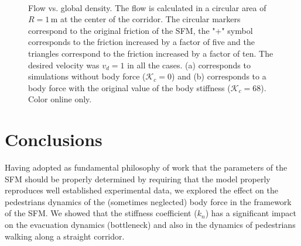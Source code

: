 \documentclass[preprint,12pt]{elsarticle}
\begin{document}
\begin{figure}[!htbp]
\centering
    \ 
    \\
\caption[width=0.47\columnwidth]{Flow vs. global density. The flow is calculated in a circular area of $R=1\,$m at the center of the corridor. The circular markers correspond to the original friction of the SFM, the "+" symbol corresponds to the friction increased by a factor of five and the triangles correspond to the friction increased by a factor of ten. The desired velocity was $v_d=1$ in all the cases. (a) corresponds to simulations without body force ($\mathcal{K}_c =$0) and (b) corresponds to a body force with the original value of the body stiffness ($\mathcal{K}_c =$68). Color online only.}
\label{flow_density}
\end{figure}



\section{\label{conclusions}Conclusions}


Having adopted as fundamental philosophy of work that the parameters of the SFM should be properly determined by requiring that the model properly reproduces well established experimental data, we explored the effect on the pedestrians dynamics of the (sometimes neglected) body force in the framework of the SFM. We showed that the stiffness coefficient ($k_n$) has a significant impact on the evacuation dynamics (bottleneck) and also in the dynamics of pedestrians walking along a straight corridor.\\
\end{document}
